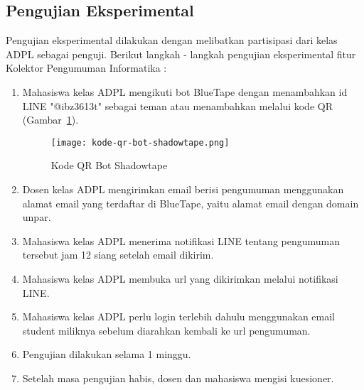 \subsection{Pengujian Eksperimental}
Pengujian eksperimental dilakukan dengan melibatkan partisipasi dari kelas ADPL sebagai penguji. Berikut langkah - langkah pengujian eksperimental fitur Kolektor Pengumuman Informatika :
\begin{enumerate}
\item Mahasiswa kelas ADPL mengikuti bot BlueTape dengan menambahkan id LINE "@ibz3613t" sebagai teman atau menambahkan melalui kode QR (Gambar~\ref{fig:kode-qr-bot-shadowtape}).

\begin{figure}[H]
	\centering  
	\texttt{[image: kode-qr-bot-shadowtape.png]}  
	\caption[Kode QR Bot Shadowtape]{Kode QR Bot Shadowtape} 
	\label{fig:kode-qr-bot-shadowtape} 
\end{figure}

\item Dosen kelas ADPL mengirimkan email berisi pengumuman menggunakan alamat email yang terdaftar di BlueTape, yaitu alamat email dengan domain unpar.
\item Mahasiswa kelas ADPL menerima notifikasi LINE tentang pengumuman tersebut jam 12 siang setelah email dikirim.
\item Mahasiswa kelas ADPL membuka url yang dikirimkan melalui notifikasi LINE.
\item Mahasiswa kelas ADPL perlu login terlebih dahulu menggunakan email student miliknya sebelum diarahkan kembali ke url pengumuman.
\item Pengujian dilakukan selama 1 minggu.
\item Setelah masa pengujian habis, dosen dan mahasiswa mengisi kuesioner.
\end{enumerate}